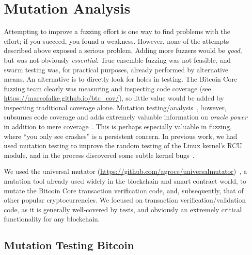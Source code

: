 \lstset{style=langstyle}
\section{Mutation Analysis}

Attempting to improve a fuzzing effort is one way to find problems
with the effort; if you succeed, you found a weakness.  However, none
of the attempts described above exposed a serious problem.  Adding more fuzzers would
be \emph{good}, but was not obviously \emph{essential}.  True ensemble
fuzzing was not feasible, and swarm testing was, for practical
purposes, already performed by alternative means.  An alternative is
to directly look for holes in testing.  The Bitcoin Core fuzzing team
clearly was measuring and inspecting code coverage (see \url{https://marcofalke.github.io/btc_cov/}), so little value
would be added by inspecting traditional coverage alone.  Mutation
testing/analysis~\cite{MutationSurvey,budd1979mutation,demillo1978hints}, however, subsumes code coverage and adds extremely
valuable information on \emph{oracle power} in addition to mere
coverage~\cite{Discontents}.  This is perhaps especially valuable in fuzzing, where ``you
only see crashes'' is a persistent concern.  In previous work, we had
used mutation testing to improve the random testing of the Linux
kernel's RCU module, and in the process discovered some subtle kernel bugs~\cite{mutKernel,groce2018verified}.

\begin{sloppypar}
We used the universal mutator
\noindent(\url{https://github.com/agroce/universalmutator})~\cite{regexpMut}, a
mutation tool already used widely in the blockchain and smart contract world, to
mutate the Bitcoin Core transaction
verification code, and, subsequently, that of other popular cryptocurrencies. We focused on transaction verification/validation code, as it is generally well-covered by
tests, and obviously an extremely critical functionality for any blockchain.
\end{sloppypar}

\subsection{Mutation Testing Bitcoin}

